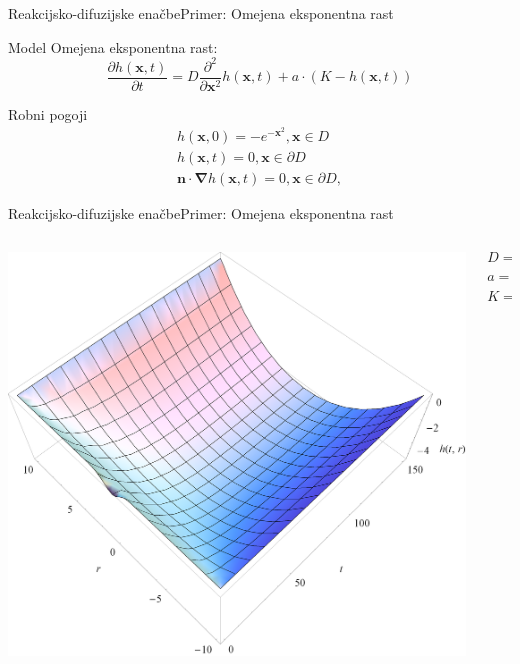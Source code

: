\documentclass{beamer}
\begin{document}
\begin{frame}{Reakcijsko-difuzijske enačbe}{Primer: Omejena eksponentna rast}
\begin{block}{Model}
 Omejena eksponentna rast:
  \begin{equation} \frac{ \partial h(\mathbf{x},t) }{ \partial t} = D \frac{\partial^2}{\partial \mathbf{x}^2} h(\mathbf{x},t) + a \cdot (K - h(\mathbf{x},t)) \end{equation} 
\end{block}
\begin{block}{Robni pogoji}
    \begin{equation}
      \begin{aligned}
        h(\mathbf{x},0) =  - e^{-\mathbf{x}^2}, \mathbf{x} \in D \\
        h(\mathbf{x},t) = 0, \mathbf{x} \in \partial D \\
        \mathbf{n} \cdot \boldsymbol \nabla h(\mathbf{x},t) = 0, \mathbf{x} \in \partial D,
      \end{aligned}
    \end{equation}
\end{block}
\end{frame}

\begin{frame}{Reakcijsko-difuzijske enačbe}{Primer:  Omejena eksponentna rast}
\begin{columns}
  \begin{column}{0.8\textwidth}
    \includegraphics[width=1.05\textwidth]{slike/difuzija-omejena-eksponentna-rast2.png}
  \end{column}
  \begin{column}{0.3\textwidth}
    \footnotesize
    \[ D = 1 \]
    \[ a = \frac{1}{50} \]
    \[ K = -10 \]
  \end{column}
\end{columns}
\end{frame}
\end{document}
